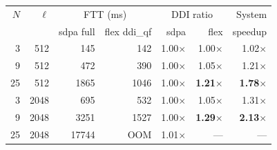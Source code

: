\begin{tabular}{rr rr rr r}
\toprule
$N$ & $\ell$ & \multicolumn{2}{c}{FTT (ms)} & \multicolumn{2}{c}{DDI ratio} & System \\
 & & sdpa full & flex ddi\_qf & sdpa & flex & speedup \\
\midrule
3 & 512 & 145 & 142 & 1.00$\times$ & 1.00$\times$ & 1.02$\times$ \\
9 & 512 & 472 & 390 & 1.00$\times$ & 1.05$\times$ & 1.21$\times$ \\
25 & 512 & 1865 & 1046 & 1.00$\times$ & \textbf{1.21$\times$} & \textbf{1.78$\times$} \\
3 & 2048 & 695 & 532 & 1.00$\times$ & 1.05$\times$ & 1.31$\times$ \\
9 & 2048 & 3251 & 1527 & 1.00$\times$ & \textbf{1.29$\times$} & \textbf{2.13$\times$} \\
25 & 2048 & 17744 & OOM & 1.01$\times$ & --- & --- \\
\bottomrule
\end{tabular}
